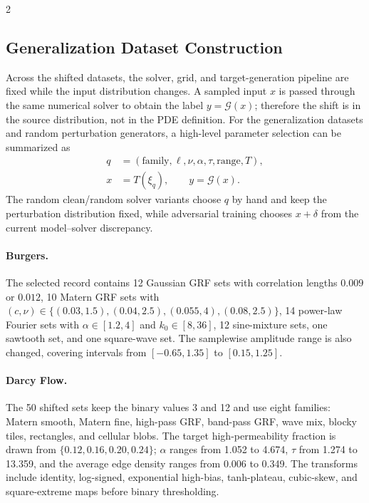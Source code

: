 \clearpage
{}
\begin{multicols}{2}

\subsection*{Generalization Dataset Construction}

Across the shifted datasets, the solver, grid, and target-generation
pipeline are fixed while the input distribution changes.  A sampled input $x$ is
passed through the same numerical solver to obtain the label $y=\mathcal G(x)$;
therefore the shift is in the source distribution, not in the PDE definition.
For the generalization datasets and random perturbation generators, a high-level parameter
selection can be summarized as
\begin{align}
  q
  &=
  (\text{family},\ell,\nu,\alpha,\tau,\text{range},T),
  \nonumber\\
  x
  &=
  T(\xi_q),
  \qquad
  y=\mathcal G(x).
\end{align}
The random clean/random solver variants choose $q$ by hand and keep the
perturbation distribution fixed, while adversarial training chooses
$x+\delta$ from the current model--solver discrepancy.

\paragraph{Burgers.}
The selected record contains 12
Gaussian GRF sets with correlation lengths $0.009$ or $0.012$, 10 Matern GRF
sets with $(c,\nu)\in\{(0.03,1.5),(0.04,2.5),(0.055,4),(0.08,2.5)\}$, 14
power-law Fourier sets with $\alpha\in[1.2,4]$ and $k_0\in[8,36]$, 12 sine-mixture
sets, one sawtooth set, and one square-wave set.  The samplewise amplitude
range is also changed, covering intervals from $[-0.65,1.35]$ to $[0.15,1.25]$.

\paragraph{Darcy Flow.}
The 50 shifted sets keep the binary values 3 and 12 and use eight families:
Matern smooth, Matern fine, high-pass GRF, band-pass GRF, wave mix, blocky
tiles, rectangles, and cellular blobs.  The
target high-permeability fraction is drawn from $\{0.12,0.16,0.20,0.24\}$;
$\alpha$ ranges from 1.052 to 4.674, $\tau$ from 1.274 to 13.359, and the
average edge density ranges from 0.006 to 0.349.  The transforms include
identity, log-signed, exponential high-bias, tanh-plateau, cubic-skew, and
square-extreme maps before binary thresholding.


\end{multicols}
